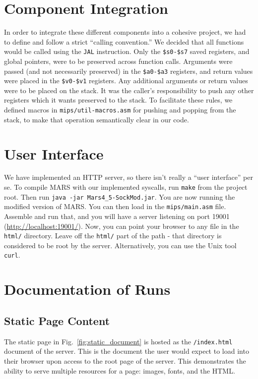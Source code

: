 \documentclass[journal,10pt]{IEEEtran}
\begin{document}
\section{Component Integration}

In order to integrate these different components into a cohesive project, we had
to define and follow a strict ``calling convention.''  We decided that all
functions would be called using the \texttt{JAL} instruction.  Only the
\texttt{\$s0-\$s7} saved registers, and global pointers, were to be preserved
across function calls. Arguments were passed (and not necessarily preserved) in
the \texttt{\$a0-\$a3} registers, and return values were placed in the
\texttt{\$v0-\$v1} registers. Any additional arguments or return values were to
be placed on the stack. It was the caller's responsibility to push any other
registers which it wants preserved to the stack.  To facilitate these rules, we
defined macros in \texttt{mips/util-macros.asm} for pushing and popping from the
stack, to make that operation semantically clear in our code.

\section{User Interface}

We have implemented an HTTP server, so there isn't really a ``user interface''
per se. To compile MARS with our implemented syscalls, run \texttt{make} from
the project root. Then run \texttt{java -jar Mars4\_5-SockMod.jar}. You are now
running the modified version of MARS. You can then load in the
\texttt{mips/main.asm} file. Assemble and run that, and you will have a server
listening on port 19001 (\url{http://localhost:19001/}). Now, you can point your
browser to any file in the \texttt{html/} directory. Leave off the
\texttt{html/} part of the path - that directory is considered to be root by the
server. Alternatively, you can use the Unix tool \texttt{curl}.

\section{Documentation of Runs}

\subsection{Static Page Content}

The static page in Fig.~\ref{fig:static_document} is hosted as the
\texttt{/index.html} document of the server. This is the document the user would
expect to load into their browser upon access to the root page of the server.
This demonstrates the ability to serve multiple resources for a page: images,
fonts, and the HTML.
\end{document}
